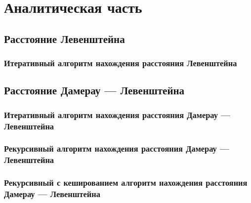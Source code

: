 \section{Аналитическая часть}

\subsection{Расстояние Левенштейна}

\subsubsection{Итеративный алгоритм нахождения расстояния Левенштейна}

\subsection{Расстояние Дамерау --- Левенштейна}

\subsubsection{Итеративный алгоритм нахождения расстояния Дамерау --- Левенштейна}

\subsubsection{Рекурсивный алгоритм нахождения расстояния Дамерау --- Левенштейна}

\subsubsection{Рекурсивный с кешированием алгоритм нахождения расстояния Дамерау --- Левенштейна}
